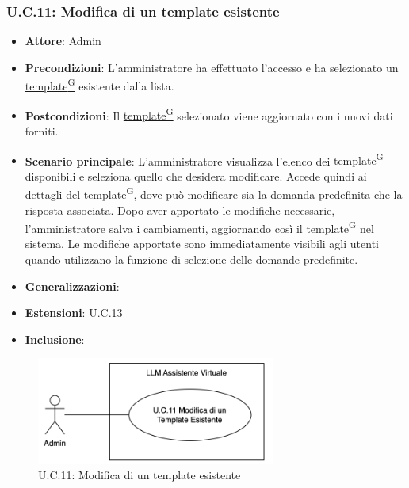 \subsubsection{U.C.11: Modifica di un template esistente}
\begin{itemize}
    \item \textbf{Attore}: Admin
    \item \textbf{Precondizioni}: L'amministratore ha effettuato l'accesso e ha selezionato un \href{https://code7crusaders.github.io/docs/PB/documentazione_interna/glossario.html#template}{template\textsuperscript{G}} esistente dalla lista.
    \item \textbf{Postcondizioni}: Il \href{https://code7crusaders.github.io/docs/PB/documentazione_interna/glossario.html#template}{template\textsuperscript{G}} selezionato viene aggiornato con i nuovi dati forniti.
    \item \textbf{Scenario principale}: L'amministratore visualizza l'elenco dei \href{https://code7crusaders.github.io/docs/PB/documentazione_interna/glossario.html#template}{template\textsuperscript{G}} disponibili e seleziona quello che desidera modificare. Accede quindi ai dettagli del \href{https://code7crusaders.github.io/docs/PB/documentazione_interna/glossario.html#template}{template\textsuperscript{G}}, dove può modificare sia la domanda predefinita che la risposta associata. Dopo aver apportato le modifiche necessarie, l'amministratore salva i cambiamenti, aggiornando così il \href{https://code7crusaders.github.io/docs/PB/documentazione_interna/glossario.html#template}{template\textsuperscript{G}} nel sistema. Le modifiche apportate sono immediatamente visibili agli utenti quando utilizzano la funzione di selezione delle domande predefinite. 
    \item \textbf{Generalizzazioni}: -
    \item \textbf{Estensioni}: U.C.13
    \item \textbf{Inclusione}: -
\end{itemize}
\begin{figure}[H]
    \centering
    \includegraphics[width=0.7\textwidth]{img/UC11.png}
    \caption{U.C.11: Modifica di un template esistente}
\end{figure}
\newpage

